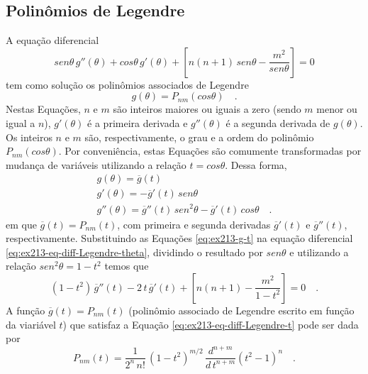\documentclass[10pt,a4paper,fleqn]{article}
\begin{document}
\subsection{Polin\^{o}mios de Legendre}

A equaç\~{a}o diferencial
\begin{equation}
sen \theta \, g''(\theta) + 
cos \theta \, g'(\theta) + 
\left[ n(n+1) \, sen \theta - \dfrac{m^{2}}{sen \theta} \right] = 0
\label{eq:ex213-eq-diff-Legendre-theta}
\end{equation}
tem como soluç\~{a}o os polin\^{o}mios associados de Legendre
\begin{equation}
g(\theta) = P_{nm}(cos\theta) \quad .
\label{eq:ex213-g-theta}
\end{equation}
Nestas Equaç\~{o}es, $n$ e $m$ s\~{a}o inteiros maiores ou iguais a zero (sendo $m$ menor ou igual a $n$), 
$g'(\theta)$ \'{e} a primeira derivada e $g''(\theta)$ \'{e} a segunda derivada de $g(\theta)$. Os inteiros $n$ 
e $m$ s\~{a}o, respectivamente, o grau e a ordem do polin\^{o}mio $P_{nm}(cos\theta)$. Por conveni\^{e}ncia, 
estas Equaç\~{o}es s\~{a}o comumente transformadas por mudança de vari\'{a}veis  utilizando a relaç\~{a}o 
$t = cos{\theta}$. Dessa forma,
\begin{equation}
\begin{array}{l}
g(\theta) = \overline{g}(t) \\
g'(\theta) = -\overline{g}'(t) \, sen \theta \\
g''(\theta) = \overline{g}''(t) \, sen^{2} \theta - \overline{g}'(t) \, cos \theta \quad .
\end{array}
\label{eq:ex213-g-t}
\end{equation}
em que $\overline{g}(t) = P_{nm}(t)$, com primeira e segunda derivadas $\overline{g}'(t)$ e $\overline{g}''(t)$, 
respectivamente. Substituindo as Equaç\~{o}es \ref{eq:ex213-g-t} na equaç\~{a}o diferencial 
\ref{eq:ex213-eq-diff-Legendre-theta}, dividindo o resultado por $sen \theta$ e utilizando a relaç\~{a}o $sen^{2} 
\theta = 1 - t^2$ temos que
\begin{equation}
(1 - t^2) \, \overline{g}''(t) - 2 \, t \, \overline{g}'(t) +
\left[ n(n+1) - \frac{m^{2}}{1 - t^2} \right] = 0 \quad .
\label{eq:ex213-eq-diff-Legendre-t}
\end{equation}
A funç\~{a}o $\overline{g}(t) = P_{nm}(t)$ (polin\^{o}mio associado de Legendre escrito em funç\~{a}o da viari\'{a}vel 
$t$) que satisfaz a Equaç\~{a}o \ref{eq:ex213-eq-diff-Legendre-t} pode ser dada por
\begin{equation}
P_{nm}(t) = \frac{1}{2^{n} \, n!} \, (1 - t^{2})^{m/2} \,
\frac{d^{n+m}}{d \, t^{n+m}}(t^{2} - 1)^{n} \quad .
\label{eq:ex213-pnm-t}
\end{equation}
\end{document}
